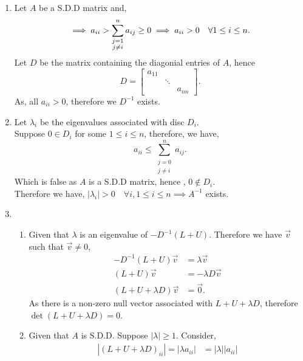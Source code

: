 \documentclass{report}
\begin{document}
\begin{solution}

	\begin{enumerate}[label=(\alph*)]
		\item Let $A $ be a S.D.D matrix and, 		      \[
			      \implies a_{ii} > \sum_{\substack{j=1\\j\neq i}}^{n} a_{ij} \ge  0 \implies a_{ii} >0 \quad \forall 1\le i \le n \\
			      .\]
		      Let $D$ be the matrix containing the diagonial entries of $A$, hence
		      \[
			      D =    \begin{bmatrix} a_{11} &        &        \\
                       & \ddots &        \\
                       &        & a_{nn}
			      \end{bmatrix}
			      .\]
		      As, all $a_{ii}>0$, therefore we $D^{-1}$ exists.
		\item Let $\lambda_i$ be the eigenvalues associated with disc $D_i$.\\
		      Suppose $0\in D_{i}$ for some $1\le i \le n $, therefore, we have,
		      \[
			      a_{ii} \leq \sum_{\substack{ j=0 \\ j\neq i }}^{n} a_{ij}
			      .\]
		      Which is false as $A$ is a S.D.D matrix, hence , $0 \not\in D_{i}$.\\
		      Therefore we have, $|\lambda_i| >0 \quad \forall i, 1\le i\le n \implies A^{-1}$ exists.
		\item \begin{enumerate}[label=(\roman*)]
			      \item Given that $\lambda$ is an eigenvalue of $-D^{-1}\left( L+U \right)$. Therefore we have $\vec v $ such that $\vec v \neq 0$,
			            \begin{align*}
				            -D^{-1}\left( L+U \right)\vec{v}  & =   \lambda \vec{{v}} \\
				            \left(L+U \right) \vec v          & =   -\lambda D\vec{{v}} \\
				            \left(L+U +\lambda D\right)\vec v & =  \vec{0}
				            .\end{align*}
			            As there is a non-zero null vector associated with $L+U+\lambda D $, therefore $\det(L+U+\lambda D) = 0$.
			      \item Given that $A$ is S.D.D.  Suppose $|\lambda| \ge 1$. Consider,
			            \begin{align*}
				            |(L+U+\lambda D )_{ii}|  = |\lambda a_{ii}| & =  |\lambda| | a_{ii}| \\

\end{align*}
\end{enumerate}
\end{enumerate}
\end{solution}
\end{document}
